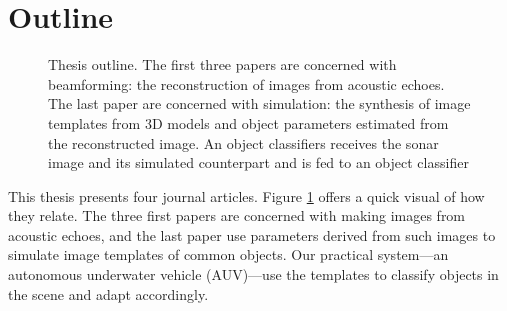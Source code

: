 %
%
%


\section{Outline}

\begin{figure}[tp]
\caption{Thesis outline. The first three papers are concerned with beamforming: the reconstruction of images from acoustic echoes. The last paper are concerned with simulation: the synthesis of image templates from 3D models and object parameters estimated from the reconstructed image. An object classifiers receives the sonar image and its simulated counterpart and  is fed to an object classifier}\label{fig_outline_simple}
\end{figure}

This thesis presents four journal articles. Figure \ref{fig_outline_simple} offers a quick visual of how they relate. The three first papers are concerned with making images from acoustic echoes, and the last paper use parameters derived from such images to simulate image templates of common objects. Our practical system---an autonomous underwater vehicle (AUV)---use the templates to classify objects in the scene and adapt accordingly. 

